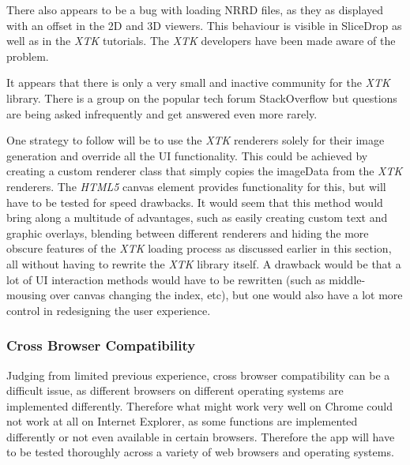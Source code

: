 \documentclass[a4paper,11pt,titlepage]{article}
\begin{document}
There also appears to be a bug with loading NRRD files, as they as displayed with an offset in the 2D and 3D viewers. This behaviour is visible in SliceDrop as well as in the \textit{XTK} tutorials. The \textit{XTK} developers have been made aware of the problem.

It appears that there is only a very small and inactive community for the \textit{XTK} library. There is a group on the popular tech forum StackOverflow but questions are being asked infrequently and get answered even more rarely.

One strategy to follow will be to use the \textit{XTK} renderers solely for their image generation and override all the UI functionality. This could be achieved by creating a custom renderer class that simply copies the imageData from the \textit{XTK} renderers. The \textit{HTML5} canvas element provides functionality for this, but will have to be tested for speed drawbacks. It would seem that this method would bring along a multitude of advantages, such as easily creating custom text and graphic overlays, blending between different renderers and hiding the more obscure features of the \textit{XTK} loading process as discussed earlier in this section, all without having to rewrite the \textit{XTK} library itself. A drawback would be that a lot of UI interaction methods would have to be rewritten (such as middle-mousing over canvas changing the index, etc), but one would also have a lot more control in redesigning the user experience.

\subsubsection{Cross Browser Compatibility}

Judging from limited previous experience, cross browser compatibility can be a difficult issue, as different browsers on different operating systems are implemented differently. Therefore what might work very well on Chrome could not work at all on Internet Explorer, as some functions are implemented differently or not even available in certain browsers. Therefore the app will have to be tested thoroughly across a variety of web browsers and operating systems.


\newpage
\end{document}
